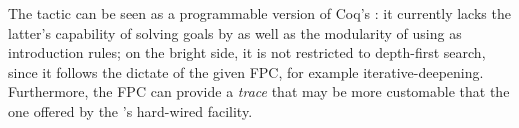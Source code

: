 The  tactic can be seen as a programmable version of
Coq's : it currently lacks the latter's capability of
solving goals by  as well as the modularity of using
 as introduction rules; on the bright side, it is not
restricted to depth-first search, since it follows the dictate of the
given FPC, for example iterative-deepening. Furthermore, the FPC can
provide a \emph{trace} that may be more customable that the one
offered by the 's hard-wired  facility.
%


